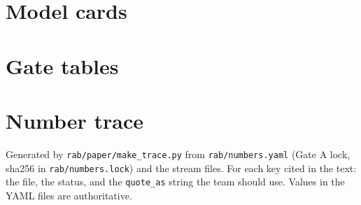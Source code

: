 \documentclass[11pt,a4paper]{article}
\begin{document}
\FloatBarrier
\label{lastmainpage}
\renewcommand{\bibfont}{\small\raggedright}



\clearpage
\appendix
\section{Model cards}\label{app:cards}


\clearpage
\section{Gate tables}\label{app:gates}


\clearpage
\section{Number trace}\label{app:trace}
Generated by \texttt{rab/paper/make\_trace.py} from \texttt{rab/numbers.yaml} (Gate A lock, sha256 in
\texttt{rab/numbers.lock}) and the stream files. For each key cited in the text: the file, the status, and the
\texttt{quote\_as} string the team should use. Values in the YAML files are authoritative.

\end{document}
